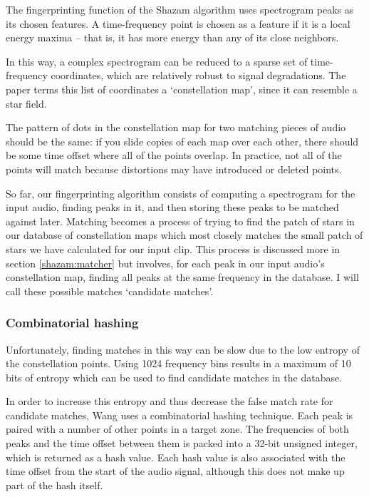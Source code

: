 \documentclass[12pt,a4paper,twoside,openright]{report}
\begin{document}
The fingerprinting function of the Shazam algorithm uses spectrogram peaks as its chosen features. A time-frequency point is chosen as a feature if it is a local energy maxima -- that is, it has more energy than any of its close neighbors.

In this way, a complex spectrogram can be reduced to a sparse set of time-frequency coordinates, which are relatively robust to signal degradations. The paper terms this list of coordinates a `constellation map', since it can resemble a star field. 

The pattern of dots in the constellation map for two matching pieces of audio should be the same: if you slide copies of each map over each other, there should be some time offset where all of the points overlap. In practice, not all of the points will match because distortions may have introduced or deleted points.

So far, our fingerprinting algorithm consists of computing a spectrogram for the input audio, finding peaks in it, and then storing these peaks to be matched against later. Matching becomes a process of trying to find the patch of stars in our database of constellation maps which most closely matches the small patch of stars we have calculated for our input clip. This process is discussed more in section \ref{shazam:matcher} but involves, for each peak in our input audio's constellation map, finding all peaks at the same frequency in the database. I will call these possible matches `candidate matches'.

\subsubsection{Combinatorial hashing}

Unfortunately, finding matches in this way can be slow due to the low entropy of the constellation points. Using 1024 frequency bins results in a maximum of 10 bits of entropy which can be used to find candidate matches in the database. 

In order to increase this entropy and thus decrease the false match rate for candidate matches, Wang uses a combinatorial hashing technique. Each peak is paired with a number of other points in a target zone. The frequencies of both peaks and the time offset between them is packed into a 32-bit unsigned integer, which is returned as a hash value. Each hash value is also associated with the time offset from the start of the audio signal, although this does not make up part of the hash itself.
\end{document}
